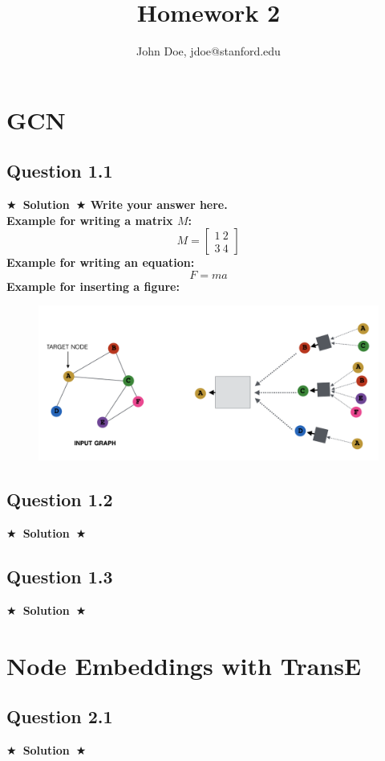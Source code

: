 \documentclass{article}
\title{Homework 2}
\author{John Doe, jdoe@stanford.edu}
\newcommand{\Solution}[1]{{\medskip \color{black} \bf $\bigstar$~\sf \textbf{Solution}~$\bigstar$ \sf #1 } \bigskip}
\begin{document}
\maketitle

\section{GCN}
\subsection*{Question 1.1}
\Solution{Write your answer here. \\ Example for writing a matrix $M$: \\
 \[M = 
    \begin{bmatrix}
    1 \ 2   \\
    3 \ 4
    \end{bmatrix}
\]
Example for writing an equation:
\begin{equation}
    F=ma
\end{equation}
Example for inserting a figure: 
\begin{figure}[!htb]
\centering
  \includegraphics[width=0.8\columnwidth]{Sample_Image.png}
  \label{fig:Q1.1}
\end{figure}
}

\subsection*{Question 1.2}
\Solution{}

\subsection*{Question 1.3}
\Solution{}


\section{Node Embeddings with TransE}

\subsection*{Question 2.1}
\Solution{}
\end{document}
